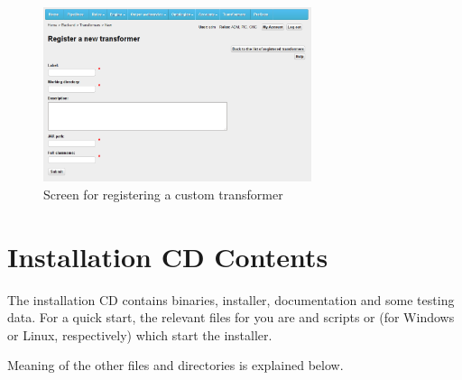 \begin{figure}[hb]
    \centering
    \includegraphics[width=0.7\textwidth]{images/fe-custom-transformer.png}
    \caption{Screen for registering a custom transformer}
    \label{fig:customTransformer}
\end{figure}




\appendix

\chapter{Installation CD Contents}
The installation CD contains \odcs binaries, installer, documentation and some testing data. For a quick start, the relevant files for you are  and scripts  or  (for Windows or Linux, respectively) which start the installer.

Meaning of the other files and directories is explained below.

